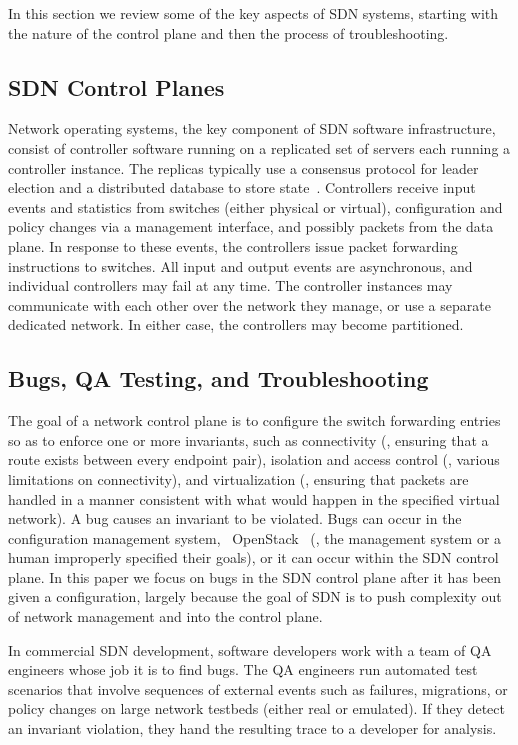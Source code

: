 In this section we review some of the key aspects of SDN systems, starting with the nature of the control plane and then the process of troubleshooting.

\subsection{SDN Control Planes}
Network operating systems, the key component of SDN software
infrastructure, consist of controller software running on a replicated set of
servers each running a controller instance. The replicas typically use a
consensus protocol for leader election and a distributed database to store
state~\cite{onix}. Controllers receive input events and
statistics from switches (either physical or virtual), configuration and
policy changes via a management interface, and possibly packets from the data
plane. In response to these events, the
controllers issue packet forwarding instructions to switches. All input
and output events are asynchronous, and individual controllers may fail at any
time. The controller instances may communicate
with each other over the network they manage, or use a separate dedicated
network. In either case, the controllers may become partitioned.

\subsection{Bugs, QA Testing, and Troubleshooting}
The goal of a network control plane is to configure the switch forwarding entries so as to
enforce one or more invariants, such as connectivity (\ie, ensuring that a
route exists between every endpoint pair), isolation and access control (\ie, various limitations on
connectivity), and virtualization (\ie, ensuring that packets are handled
in a manner consistent with what would happen in the specified virtual
network). A bug causes an invariant to be violated. Bugs can occur in the
configuration management system, \eg~OpenStack~\cite{quantum} (\ie, the
management system or a human improperly specified their goals), or it
can occur within the SDN control plane. In this paper we focus on bugs in the
SDN control plane after it has been given a configuration,
largely because the goal of SDN is to push complexity out of network management
and into the control plane.

In commercial SDN development, software developers work with a team of QA engineers whose
job it is to find bugs. The QA engineers run automated test scenarios that involve
sequences of external events such as failures, migrations, or policy changes
on large network testbeds (either real or emulated).
If they detect an invariant violation, they hand the resulting trace to a developer for analysis.


